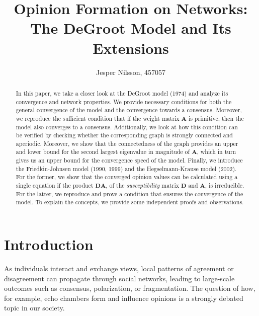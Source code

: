 \documentclass[journal,compsoc,10pt]{IEEEtran}
\renewcommand{\vec}[1]{\bm{#1}}        %
\newcommand{\mat}[1]{\bm{#1}}          %
\begin{document}

\title{Opinion Formation on Networks: The DeGroot Model and Its Extensions}

\author{Jesper Nilsson, 457057}

\maketitle
\thispagestyle{plain}
\pagestyle{plain}

\begin{abstract}
    In this paper, we take a closer look at the DeGroot model (1974) and analyze its convergence and network properties. We provide necessary conditions for both the general convergence of the model and the convergence towards a consensus.
    Moreover, we reproduce the sufficient condition that if the weight matrix $\mat A$ is primitive, then the model also converges to a consensus. Additionally, we look at how this condition can be verified by checking whether the corresponding graph is strongly connected and aperiodic. 
    Moreover, we show that the connectedness of the graph provides an upper and lower bound for the second largest eigenvalue in magnitude of $\mat A$, which in turn gives us an upper bound for the convergence speed of the model. Finally, we introduce the Friedkin-Johnsen model (1990, 1999) and the Hegselmann-Krause model (2002). For the former, we show that the converged opinion values can be calculated using a single equation if the product $\mat D\mat A$, of the \textit{susceptibility} matrix $\mat D$ and $\mat A$, is irreducible. For the latter, we reproduce and prove a condition that ensures the convergence of the model. To explain the concepts, we provide some independent proofs and observations.
\end{abstract}


\section{Introduction}
As individuals interact and exchange views, local patterns of agreement or disagreement can propagate through social networks, leading to large-scale outcomes such as consensus, polarization, or fragmentation. The question of how, for example, echo chambers form and influence opinions is a strongly debated topic in our society.
\end{document}
